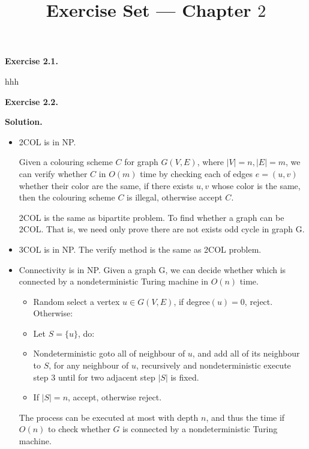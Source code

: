 \documentclass[a4paper]{article}
\title{Exercise Set --- Chapter $2$}
\date{}
\newenvironment{exercise}[1]{
	\par
	\noindent\textbf{Exercise #1.}\quad
}{
	\par
	\bigskip
}
\begin{document}
\maketitle

\begin{exercise}{2.1}
    hhh
\end{exercise}
\begin{exercise}{2.2}

\textbf{Solution.}
\begin{itemize}
\item 2COL is in NP.

Given a colouring scheme $C$ for graph $G(V,E)$, where $|V| = n, |E| = m$, we can verify whether $C$ in $O(m)$ time by checking each of edges $e = (u,v)$ whether their color are the same, if there exists $u,v$ whose color is the same, then the colouring scheme $C$ is illegal, otherwise accept $C$.

2COL is the same as bipartite problem. To find whether a graph can be 2COL. That is, we need only prove there are not exists odd cycle in graph G.
\item 3COL is in NP. The verify method is the same as 2COL problem.
\item Connectivity is in NP. 
Given a graph G, we can decide whether which is connected by a nondeterministic Turing machine in $O(n)$ time.
\begin{itemize}
\item Random select a vertex $u\in G(V,E)$, if degree$(u) = 0$, reject. Otherwise:
\item Let $S = \{u\}$, do:
\item \quad Nondeterministic goto all of neighbour of $u$, and add all of its neighbour to $S$, for any neighbour of $u$, recursively and nondeterministic execute step 3 until for two adjacent step $|S|$ is fixed. 
\item If $|S| = n$, accept, otherwise reject. 
\end{itemize}
The process can be executed at most with depth $n$, and thus the time if $O(n)$ to check whether $G$ is connected by a nondeterministic Turing machine.
\end{itemize}


\end{exercise}
\end{document}
